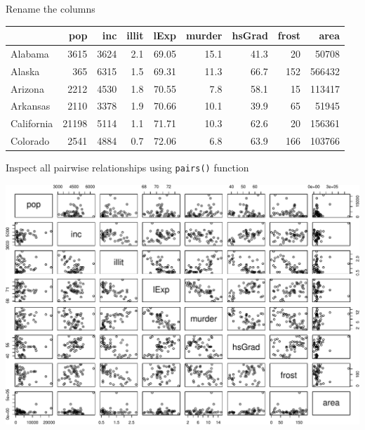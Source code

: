 \documentclass[ignorenonframetext,]{beamer}
\newenvironment{Shaded}{\begin{snugshade}}{\end{snugshade}}
\newcommand{\KeywordTok}[1]{\textcolor[rgb]{0.13,0.29,0.53}{\textbf{{#1}}}}
\newcommand{\StringTok}[1]{\textcolor[rgb]{0.31,0.60,0.02}{{#1}}}
\newcommand{\NormalTok}[1]{{#1}}
\begin{document}
\begin{frame}[fragile]{Rename the columns}

\begin{Shaded}
\end{Shaded}

\begin{longtable}[c]{@{}lrrrrrrrr@{}}
\toprule
& pop & inc & illit & lExp & murder & hsGrad & frost &
area\tabularnewline
\midrule
\endhead
Alabama & 3615 & 3624 & 2.1 & 69.05 & 15.1 & 41.3 & 20 &
50708\tabularnewline
Alaska & 365 & 6315 & 1.5 & 69.31 & 11.3 & 66.7 & 152 &
566432\tabularnewline
Arizona & 2212 & 4530 & 1.8 & 70.55 & 7.8 & 58.1 & 15 &
113417\tabularnewline
Arkansas & 2110 & 3378 & 1.9 & 70.66 & 10.1 & 39.9 & 65 &
51945\tabularnewline
California & 21198 & 5114 & 1.1 & 71.71 & 10.3 & 62.6 & 20 &
156361\tabularnewline
Colorado & 2541 & 4884 & 0.7 & 72.06 & 6.8 & 63.9 & 166 &
103766\tabularnewline
\bottomrule
\end{longtable}

\end{frame}

\begin{frame}{Inspect all pairwise relationships using \texttt{pairs()}
function}

\includegraphics{Regression_files/figure-beamer/unnamed-chunk-11-1.pdf}

\end{frame}
\end{document}
